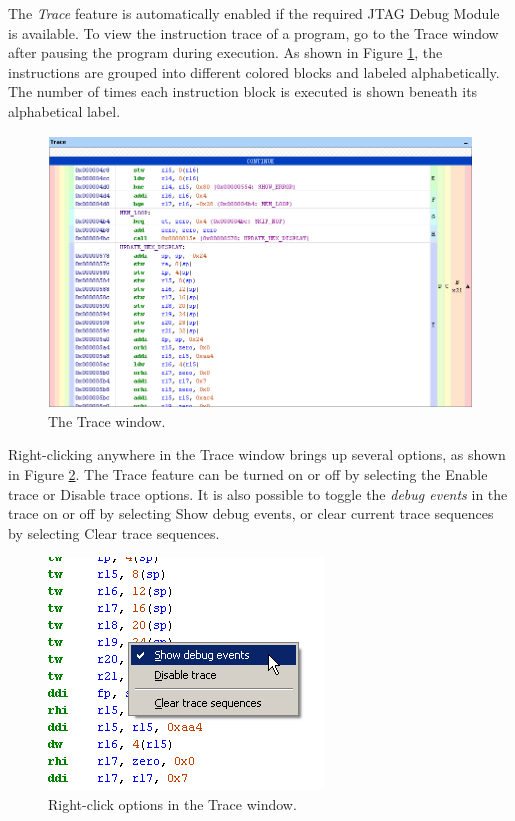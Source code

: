 \documentclass[11pt, twoside, pdftex]{article}
\begin{document}
The {\it Trace} feature is automatically enabled if the 
required JTAG Debug Module is available. To view the 
instruction trace of a program, go to the Trace window
after pausing the program during execution. As shown in 
Figure \ref{fig:AMP_traces}, the instructions are grouped into
different colored blocks and labeled alphabetically. 
The number of times each instruction block is executed is
shown beneath its alphabetical label.

\begin{figure}[H]
   \begin{center}
      \includegraphics[scale=1]{screenshots/figure62.png}
   \end{center}
   \caption{The Trace window.}
   \label{fig:AMP_traces}
\end{figure}

Right-clicking anywhere in the Trace window brings up
several options, as shown in Figure \ref{fig:AMP_trace_rightclick}.
The Trace feature can be turned on or off by selecting
the \textsf{Enable trace} or \textsf{Disable trace} options. 
It is also possible to toggle the {\it debug events} in the 
trace on or off by selecting \textsf{Show debug events}, or
clear current trace sequences by selecting 
\textsf{Clear trace sequences}. 

\begin{figure}[H]
   \begin{center}
      \includegraphics[scale=1]{screenshots/figure63.png}
   \end{center}
   \caption{Right-click options in the Trace window.}
   \label{fig:AMP_trace_rightclick}
\end{figure}
\end{document}
